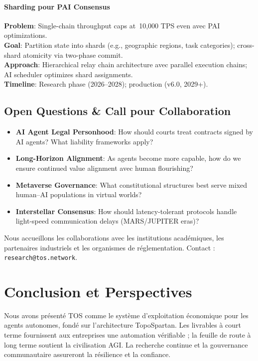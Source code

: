 \documentclass[11pt]{article}
\begin{document}
\paragraph{Sharding pour PAI Consensus}
\textbf{Problem}: Single-chain throughput caps at~10,000 TPS even avec PAI optimizations.\\
\textbf{Goal}: Partition state into shards (e.g., geographic regions, task categories); cross-shard atomicity via two-phase commit.\\
\textbf{Approach}: Hierarchical relay chain architecture avec parallel execution chains; AI scheduler optimizes shard assignments.\\
\textbf{Timeline}: Research phase (2026--2028); production (v6.0, 2029+).

\subsection{Open Questions \& Call pour Collaboration}

\begin{itemize}[noitemsep]
  \item \textbf{AI Agent Legal Personhood}: How should courts treat contracts signed by AI agents? What liability frameworks apply?
  \item \textbf{Long-Horizon Alignment}: As agents become more capable, how do we ensure continued value alignment avec human flourishing?
  \item \textbf{Metaverse Governance}: What constitutional structures best serve mixed human--AI populations in virtual worlds?
  \item \textbf{Interstellar Consensus}: How should latency-tolerant protocols handle light-speed communication delays (MARS/JUPITER eras)?
\end{itemize}

Nous accueillons les collaborations avec les institutions académiques, les partenaires industriels et les organismes de réglementation. Contact : \texttt{research@tos.network}.

\section{Conclusion et Perspectives}
Nous avons présenté TOS comme le système d'exploitation économique pour les agents autonomes, fondé sur l'architecture TopoSpartan. Les livrables à court terme fournissent aux entreprises une automation vérifiable ; la feuille de route à long terme soutient la civilisation AGI. La recherche continue et la gouvernance communautaire assureront la résilience et la confiance.
\end{document}
